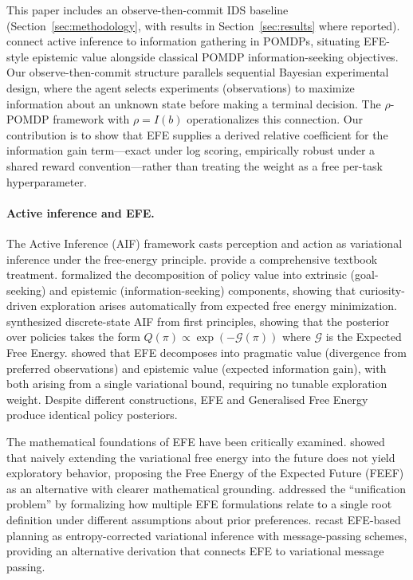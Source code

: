 \documentclass[runningheads]{llncs}
\begin{document}
This paper includes an observe-then-commit IDS baseline (Section~\ref{sec:methodology}, with results in Section~\ref{sec:results} where reported). \citet{walraven2024} connect active inference to information gathering in POMDPs, situating EFE-style epistemic value alongside classical POMDP information-seeking objectives. Our observe-then-commit structure parallels sequential Bayesian experimental design, where the agent selects experiments (observations) to maximize information about an unknown state before making a terminal decision. The $\rho$-POMDP framework with $\rho = I(b)$ operationalizes this connection. Our contribution is to show that EFE supplies a derived relative coefficient for the information gain term---exact under log scoring, empirically robust under a shared reward convention---rather than treating the weight as a free per-task hyperparameter.

\paragraph{Active inference and EFE.}
The Active Inference (AIF) framework \citep{friston2010} casts perception and action as variational inference under the free-energy principle. \citet{parr2022} provide a comprehensive textbook treatment. \citet{friston2015} formalized the decomposition of policy value into extrinsic (goal-seeking) and epistemic (information-seeking) components, showing that curiosity-driven exploration arises automatically from expected free energy minimization. \citet{dacosta2020} synthesized discrete-state AIF from first principles, showing that the posterior over policies takes the form $Q(\pi) \propto \exp(-\mathcal{G}(\pi))$ where $\mathcal{G}$ is the Expected Free Energy. \citet{parr2019} showed that EFE decomposes into pragmatic value (divergence from preferred observations) and epistemic value (expected information gain), with both arising from a single variational bound, requiring no tunable exploration weight. Despite different constructions, EFE and Generalised Free Energy produce identical policy posteriors.

The mathematical foundations of EFE have been critically examined. \citet{millidge2021} showed that naively extending the variational free energy into the future does not yield exploratory behavior, proposing the Free Energy of the Expected Future (FEEF) as an alternative with clearer mathematical grounding. \citet{champion2024} addressed the ``unification problem'' by formalizing how multiple EFE formulations relate to a single root definition under different assumptions about prior preferences. \citet{devries2025} recast EFE-based planning as entropy-corrected variational inference with message-passing schemes, providing an alternative derivation that connects EFE to variational message passing.
\end{document}
